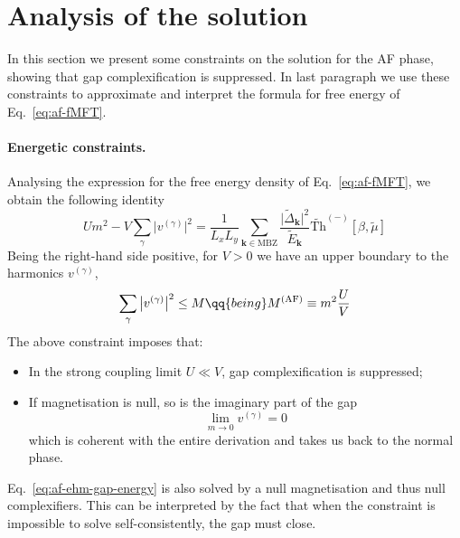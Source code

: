 \section{Analysis of the solution} \label{sec:af-sceq-analysis}

In this section we present some constraints on the solution for the AF phase, showing that gap complexification is suppressed. In last paragraph we use these constraints to approximate and interpret the formula for free energy of Eq.~\eqref{eq:af-fMFT}.

\paragraph{Energetic constraints.}

Analysing the expression for the free energy density of Eq.~\eqref{eq:af-fMFT}, we obtain the following identity
\begin{equation}\label{eq:af-ehm-gap-energy}
	Um^2 - V \sum_{\gamma} \big| v^{(\gamma)} \big|^2 = \frac{1}{L_x L_y} \sum_{\mathbf{k} \in \mathrm{MBZ}} \frac{\big|
		\tilde{\Delta}_\mathbf{k}
		\big|^2}{\tilde{E}_\mathbf{k}} \tilde{\mathrm{Th}}^{(-)}[\beta,\tilde{\mu}]
\end{equation}
Being the right-hand side positive, for $V>0$ we have an upper boundary to the harmonics $v^{(\gamma)}$,
\begin{equation}\label{eq:af-vgamma-circle}
	\sum_{\gamma} \big| v^{(\gamma)} \big|^2 \le M
	\qq{being}
	M^{(\mathrm{AF})} \equiv m^2 \frac U V
\end{equation}
The above constraint imposes that:
\begin{itemize}
	\item In the strong coupling limit $U \ll V$, gap complexification is suppressed;
	\item If magnetisation is null, so is the imaginary part of the gap
	\[
	\lim_{m\to0} v^{(\gamma)} = 0
	\]
	which is coherent with the entire derivation and takes us back to the normal phase.
\end{itemize}
Eq.~\eqref{eq:af-ehm-gap-energy} is also solved by a null magnetisation and thus null complexifiers. This can be interpreted by the fact that when the constraint is impossible to solve self-consistently, the gap must close.

